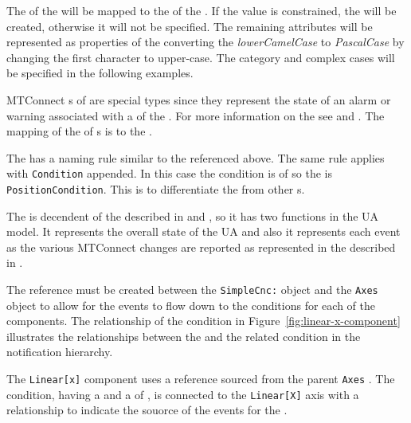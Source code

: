 The  of the  will be mapped to the   of the . If the value is constrained, the  will be created, otherwise it will not be specified. The remaining attributes will be represented as properties of the  converting the \textit{lowerCamelCase} to \textit{PascalCase} by changing the first character to upper-case. The  category and complex cases will be specified in the following examples.

MTConnect s of   are special types since they represent the state of an alarm or warning associated with a  of the . For more information on the  see \cite{MTCPart2} and \cite{MTCPart3}. The mapping of the   of s is to the .

The  has a naming rule similar to the  referenced above. The same rule applies with \texttt{Condition} appended. In this case the condition is of   so the  is \texttt{PositionCondition}. This is to differentiate the  from other s.

The  is decendent of the  described in \cite{UAPart5} and \cite{UAPart9}, so it has two functions in the UA model. It represents the overall state of the UA  and also it represents each event as the various MTConnect  changes are reported as represented in the  described in \cite{MTCPart3}.

The  reference must be created between the \texttt{SimpleCnc:} object and the \texttt{Axes} object to allow for the events to flow down to the conditions for each of the components. The relationship of the condition in Figure~\ref{fig:linear-x-component} illustrates the relationships between the  and the related condition in the notification hierarchy.

The \texttt{Linear[x]} component uses a  reference sourced from the parent \texttt{Axes} . The condition, having a  and a  of , is connected to the \texttt{Linear[X]} axis with a  relationship to indicate the souorce of the events for the .

